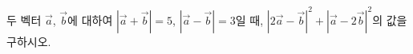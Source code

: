 두 벡터 $\vec{a}$, $\vec{b}$에 대하여 $|\vec{a}+\vec{b}|=5$, $|\vec{a}-\vec{b}|=3$일 때, $|2\vec{a}-\vec{b}|^2+|\vec{a}-2\vec{b}|^2$의 값을 구하시오.
